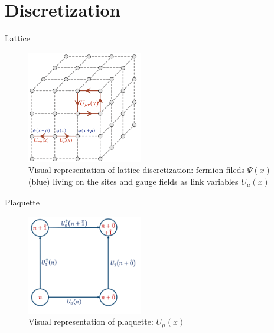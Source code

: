 \documentclass[10pt]{beamer}
\begin{document}
 \section{Discretization}
 \begin{frame}{Lattice}
    \begin{figure}
    \centering
    \includegraphics[width=0.45\textwidth]{lattice.png}
    \caption{Visual representation of lattice discretization: fermion fileds $\Psi(x)$ (blue) living on the sites and gauge fields as link variables $ U_{\mu}(x)$~\cite{gattringer2009quantum}}
    \end{figure}
 \end{frame}

 \begin{frame}{Plaquette}
    \begin{figure}
        \centering
        \includegraphics[width=0.45\textwidth]{plaquette.png}
        \caption{Visual representation of plaquette: $U_{\mu}(x)$~\cite{lecturenote}}
    \end{figure}
 
 \end{frame}
\end{document}
